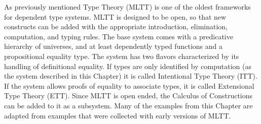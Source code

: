 As previously mentioned \MartinL{} Type Theory (\ac{MLTT})\cite{Martin-Lof-1972} is one of the oldest frameworks for dependent type systems.
\ac{MLTT} is designed to be open, so that new constructs can be added with the appropriate introduction, elimination, computation, and typing rules.
The base system comes with a predicative hierarchy of universes, and at least dependently typed functions and a propositional equality type.
The system has two flavors characterized by its handling of definitional equality.
If types are only identified by computation (as the system described in this Chapter) it is called Intentional Type Theory (\ac{ITT}).
If the system allows proofs of equality to associate types, it is called Extensional Type Theory (\ac{ETT}).
Since \ac{MLTT} is open ended, the Calculus of Constructions can be added to it as a subsystem\cite{aspinall2004dependent,hofmann1997extensional}.
Many of the examples from this Chapter are adapted from examples that were collected with early versions of \ac{MLTT}\cite{Martin-Lof-1971}.
 

 
